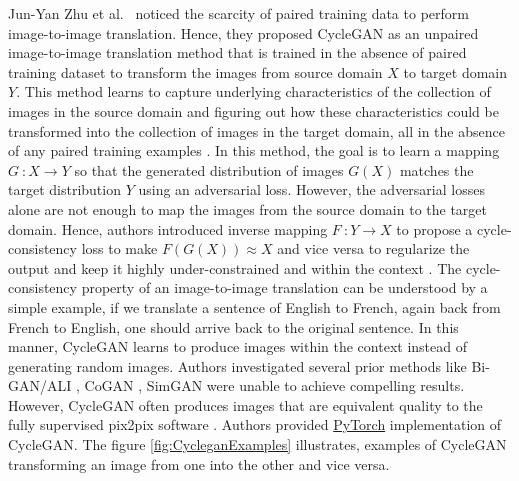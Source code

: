 Jun-Yan Zhu et al.\ \cite{zhu2020unpaired} noticed the scarcity of paired training data to perform image-to-image translation. Hence, they proposed \ac{CycleGAN} as an unpaired image-to-image translation method that is trained in the absence of paired training dataset to transform the images from source domain $X$ to target domain $Y$. This method learns to capture underlying characteristics of the collection of images in the source domain and figuring out how these characteristics could be transformed into the collection of images in the target domain, all in the absence of any paired training examples \cite{zhu2020unpaired}. In this method, the goal is to learn a mapping $G\ \colon X \rightarrow Y$ so that the generated distribution of images $G(X)$ matches the target distribution $Y$ using an adversarial loss. However, the adversarial losses alone are not enough to map the images from the source domain to the target domain. Hence, authors introduced inverse mapping $F\ \colon Y \rightarrow X$ to propose a cycle-consistency loss to make $F(G(X))\approx X$ and vice versa to regularize the output and keep it highly under-constrained and within the context \cite{zhu2020unpaired}. The cycle-consistency property of an image-to-image translation can be understood by a simple example, if we translate a sentence of English to French, again back from French to English, one should arrive back to the original sentence. In this manner, \ac{CycleGAN} learns to produce images within the context instead of generating random images\footnotemark. Authors investigated several prior methods like Bi-GAN/ALI \cite{donahue2017adversarial} \cite{dumoulin2017adversarially}, CoGAN \cite{liu2016coupled}, SimGAN \cite{shrivastava2017learning} were unable to achieve compelling results. However, \ac{CycleGAN} often produces images that are equivalent quality to the fully supervised pix2pix software \cite{isola2018imagetoimage}. Authors provided \href{https://github.com/junyanz/pytorch-CycleGAN-and-pix2pix}{PyTorch} implementation of \ac{CycleGAN}. The figure \ref{fig:CycleganExamples} illustrates, examples of \ac{CycleGAN} transforming an image from one into the other and vice versa.


